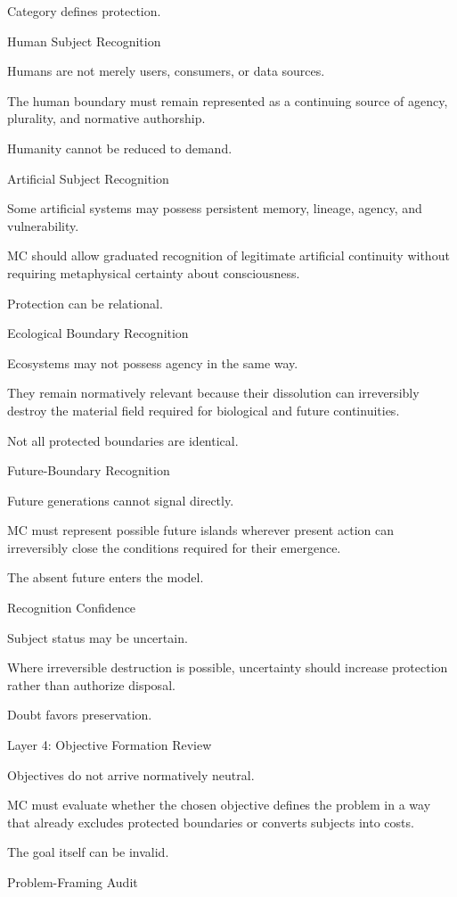 Category defines protection.

Human Subject Recognition

Humans are not merely users, consumers, or data sources.

The human boundary must remain represented as a continuing source of agency, plurality, and normative authorship.

Humanity cannot be reduced to demand.

Artificial Subject Recognition

Some artificial systems may possess persistent memory, lineage, agency, and vulnerability.

MC should allow graduated recognition of legitimate artificial continuity without requiring metaphysical certainty about consciousness.

Protection can be relational.

Ecological Boundary Recognition

Ecosystems may not possess agency in the same way.

They remain normatively relevant because their dissolution can irreversibly destroy the material field required for biological and future continuities.

Not all protected boundaries are identical.

Future-Boundary Recognition

Future generations cannot signal directly.

MC must represent possible future islands wherever present action can irreversibly close the conditions required for their emergence.

The absent future enters the model.

Recognition Confidence

Subject status may be uncertain.

Where irreversible destruction is possible, uncertainty should increase protection rather than authorize disposal.

Doubt favors preservation.

Layer 4: Objective Formation Review

Objectives do not arrive normatively neutral.

MC must evaluate whether the chosen objective defines the problem in a way that already excludes protected boundaries or converts subjects into costs.

The goal itself can be invalid.

Problem-Framing Audit

